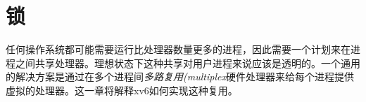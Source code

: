 \chapter{锁}

任何操作系统都可能需要运行比处理器数量更多的进程，因此需要一个计划来在进程之间共享处理器。理想状态下这种共享对用户进程来说应该是透明的。一个通用的解决方案是通过在多个进程间\emph{多路复用(multiplex}硬件处理器来给每个进程提供虚拟的处理器。这一章将解释xv6如何实现这种复用。
